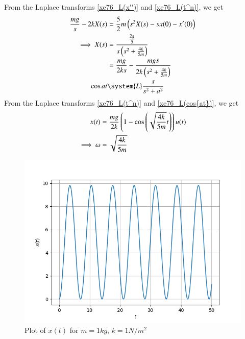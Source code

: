 \documentclass[journal,12pt,twocolumn]{IEEEtran}
\theoremstyle{remark}
\begin{document}
From the Laplace transforms \eqref{xe76_L(x'')} and \eqref{xe76_L(t^n)}, we get
\begin{align}
\frac{mg}{s}-2kX(s)&=\frac{5}{2}m\brak{s^2X(s)-sx(0)-x'(0)}\\
\implies X(s) &= \frac{\frac{2g}{5}}{s\brak{s^2+\frac{4k}{5m}}}\\
&= \frac{mg}{2ks}-\frac{mgs}{2k\brak{s^2+\frac{4k}{5m}}}\\
\label{xe76_L(cos{at})} \cos{at} &\system{L} \frac{s}{s^2+a^2}
\end{align}
From the Laplace transforms \eqref{xe76_L(t^n)} and \eqref{xe76_L(cos{at})}, we get
\begin{align}
x(t) &= \frac{mg}{2k}\left(1-\cos{\ensuremath{\left(\sqrt{\frac{4k}{5m}}t\right)}}\right)u(t)\\
\implies \omega &= \sqrt{\frac{4k}{5m}}
\end{align}
\begin{figure}[htbp]
	\includegraphics[width=\columnwidth]{figs/plot.png}
	\caption{Plot of $x(t)$ for $m=1kg$, $k=1N/m^2$}
	\label{fig:plot_xe76}
\end{figure}
\end{document}
